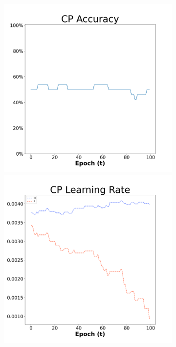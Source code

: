 \begin{figure}[H]
    \centering %
\begin{subfigure}{0.3\textwidth}
  \includegraphics[width=\linewidth]{images/exper1/Sonar/CP_0.01_acc.png}
    \includegraphics[width=\linewidth]{images/exper1/Sonar/CP_0.01_lr.png}

\end{subfigure}
\end{figure}
